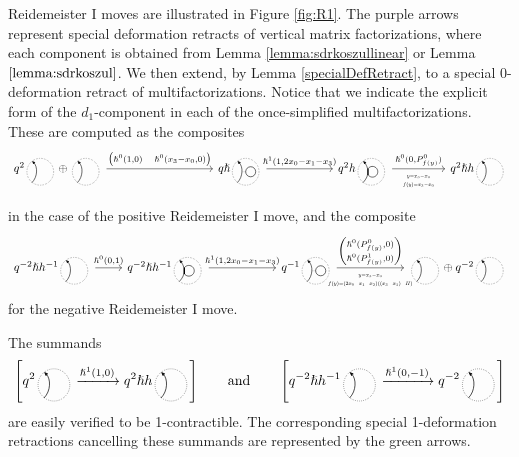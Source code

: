 \documentclass{article}
\theoremstyle{plain} %
\theoremstyle{definition} %
\theoremstyle{remark} %
\begin{document}
Reidemeister I moves are illustrated in Figure \ref{fig:R1}. The purple arrows represent special deformation retracts of vertical matrix factorizations, where each component is obtained from Lemma \ref{lemma:sdrkoszullinear} or Lemma $\ref{lemma:sdrkoszul}$. We then extend, by Lemma \ref{specialDefRetract}, to a special 0-deformation retract of multifactorizations. Notice that we indicate the explicit form of the $d_1$-component in each of the once-simplified multifactorizations. These are computed as the composites
\[
\begin{tikzcd}[column sep=2cm,ampersand replacement=\&]
	q^2\scalebox{0.5}{\SingleEdge{}{}}\oplus \scalebox{0.5}{\SingleEdge{}{}}   
	\arrow[r, "{\begin{pmatrix} \hslash^0(1,0)&\hslash^0(x_3-x_0,0)
	\end{pmatrix}}"] 
	\&[1.2cm]
	q\hslash\scalebox{0.5}{\ThinEdgeAndCircle{}{}{}} 
	\arrow[r, "{\hslash^1(1,2x_0-x_1-x_3)}"]
	\&
	q^2h\scalebox{0.5}{\ThickEdgeAndCircle{}{}{}}
	\arrow[r, "{\hslash^0(0,P^0_{f(y)})}", "\scalebox{0.6}{$\begin{matrix}
			y=x_3-x_0 \\ f(y)= x_3-x_0
		\end{matrix}$}"']
	\&[-0.4cm]
	q^2\hslash h\scalebox{0.5}{\SingleEdge{}{}} 
\end{tikzcd}
\]

in the case of the positive Reidemeister I move, and the composite
\[
\begin{tikzcd}[column sep=2cm, ampersand replacement=\&]
	q^{-2}\hslash h^{-1}\scalebox{0.5}{\SingleEdge{}{}}  
	\arrow[r, "{\hslash^0(0,1)}"] 
	\&[-1.2cm]
	q^{-2}\hslash h^{-1}\scalebox{0.5}{\ThickEdgeAndCircle{}{}{}}
	\arrow[r, "{\hslash^1(1,2x_0-x_1-x_3)}"]
	\&
	q^{-1}\scalebox{0.5}{\ThinEdgeAndCircle{}{}{}} 
	\arrow[r, "{\begin{pmatrix} \hslash^0(P^0_{f(y)},0) \\
			\hslash^0(P^1_{f(y)},0) \end{pmatrix}}", "\scalebox{0.6}{$\begin{matrix}
			y=x_3-x_0 \\ f(y)= (2x_0-x_1-x_3)((x_3-x_1)-H)
		\end{matrix}$}"']
	\&
	\scalebox{0.5}{\SingleEdge{}{}}\oplus q^{-2}\scalebox{0.5}{\SingleEdge{}{}}
\end{tikzcd}
\]
for the negative Reidemeister I move.


The summands 
$$
\left[q^2\scalebox{0.5}{\SingleEdge{}{}}
\xrightarrow{\hslash^1(1,0)} 
q^2\hslash h\scalebox{0.5}{\SingleEdge{}{}}\right]
\qquad \mbox{and}\qquad 
\left[q^{-2}\hslash h^{-1}\scalebox{0.5}{\SingleEdge{}{}}
\xrightarrow{\hslash^1(0,-1)} 
q^{-2}\scalebox{0.5}{\SingleEdge{}{}}\right]
$$
are easily verified to be 1-contractible. The corresponding special 1-deformation retractions cancelling these summands are represented by the green arrows.
\end{document}

